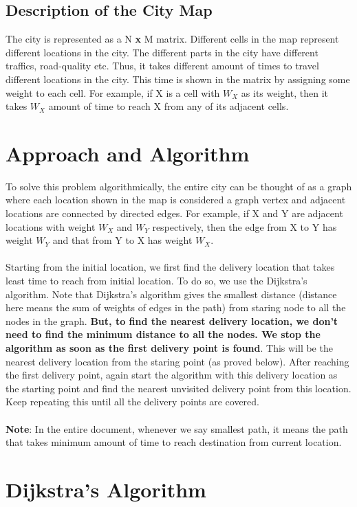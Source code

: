 \documentclass{article}
\begin{document}
\subsection{Description of the City Map}
The city is represented as a N \textbf{x} M matrix. Different cells in the map represent different locations in the city. The different parts in the city have different traffics, road-quality etc. Thus, it takes different amount of times to travel different locations in the city. This time is shown in the matrix by assigning some weight to each cell. For example, if X is a cell with $W_X$ as its weight, then it takes $W_X$ amount of time to reach X from any of its adjacent cells.

\section{Approach and Algorithm}
To solve this problem algorithmically, the entire city can be thought of as a graph where each location shown in the map is considered a graph vertex and adjacent locations are connected by directed edges. For example, if X and Y are adjacent locations with weight $W_X$ and $W_Y$ respectively, then the edge from X to Y has weight $W_Y$ and that from Y to X has weight $W_X$.
\\\\
Starting from the initial location, we first find the delivery location that takes least time to reach from initial location. To do so, we use the Dijkstra's algorithm. Note that Dijkstra's algorithm gives the smallest distance (distance here means the sum of weights of edges in the path) from staring node to all the nodes in the graph. \textbf{But, to find the nearest delivery location, we don't need to find the minimum distance to all the nodes. We stop the algorithm as soon as the first delivery point is found}. This will be the nearest delivery location from the staring point (as proved below). After reaching the first delivery point, again start the algorithm with this delivery location as the starting point and find the nearest unvisited delivery point from this location. Keep repeating this until all the delivery points are covered.
\\\\
\textbf{Note}: In the entire document, whenever we say smallest path, it means the path that takes minimum amount of time to reach destination from current location.

\section{Dijkstra's Algorithm}
\end{document}
